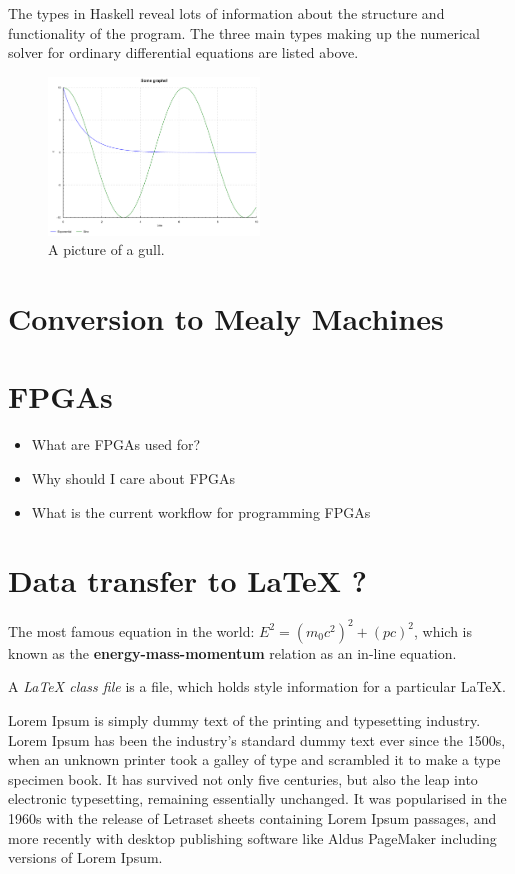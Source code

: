 
The types in Haskell reveal lots of information about the structure and functionality of the program. The three main types making up the numerical solver for ordinary differential equations are listed above.

\begin{figure}[h!]
	\caption{A picture of a gull.}
	\centering
	\includegraphics[width=0.5\textwidth]{../haskell/output.pdf}
\end{figure}

\section{Conversion to Mealy Machines}

\section{FPGAs}
\begin{itemize}
	\item What are FPGAs used for?
	\item Why should I care about FPGAs
	\item What is the current workflow for programming FPGAs
\end{itemize}


\section{Data transfer to \LaTeX{} ?}


The most famous equation in the world: $E^2 = (m_0c^2)^2 + (pc)^2$, which is 
known as the \textbf{energy-mass-momentum} relation as an in-line equation.

A {\em \LaTeX{} class file} is a file, which holds style information for a particular \LaTeX{}.

Lorem Ipsum is simply dummy text of the printing and typesetting industry. Lorem Ipsum has been the industry's 
standard dummy text ever since the 1500s, when an unknown printer took a galley 
of type and scrambled it to make a type specimen book. It has survived not only 
five centuries, but also the leap into electronic typesetting, remaining 
essentially unchanged. It was popularised in the 1960s with the release of 
Letraset sheets containing Lorem Ipsum passages, and more recently with desktop 
publishing software like Aldus PageMaker including versions of Lorem 
Ipsum.